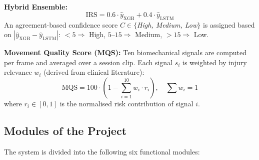 \documentclass[12pt,a4paper]{report}
\begin{document}
\textbf{Hybrid Ensemble:}
\begin{equation}\label{eq:hybrid}
  \text{IRS} = 0.6 \cdot \hat{y}_{\text{XGB}} + 0.4 \cdot \hat{y}_{\text{LSTM}}
\end{equation}
An agreement-based confidence score $C \in \{$\textit{High, Medium, Low}$\}$ is assigned based on $|\hat{y}_{\text{XGB}} - \hat{y}_{\text{LSTM}}|$: $< 5 \Rightarrow$ High, $5$--$15 \Rightarrow$ Medium, $> 15 \Rightarrow$ Low.

\textbf{Movement Quality Score (MQS):}
Ten biomechanical signals are computed per frame and averaged over a session clip. Each signal $s_i$ is weighted by injury relevance $w_i$ (derived from clinical literature):
\begin{equation}\label{eq:mqs}
  \text{MQS} = 100 \cdot \left(1 - \sum_{i=1}^{10} w_i \cdot r_i\right), \quad \sum w_i = 1
\end{equation}
where $r_i \in [0,1]$ is the normalised risk contribution of signal $i$.

\subsection{Modules of the Project}

The system is divided into the following six functional modules:
\end{document}
